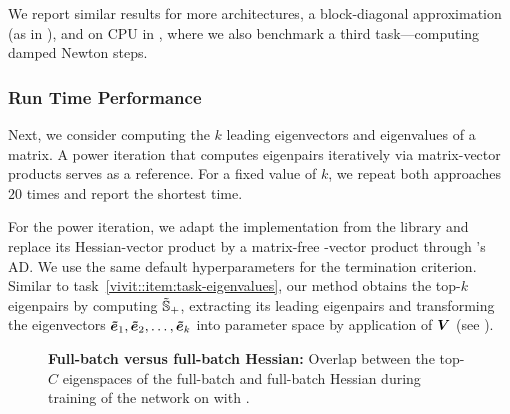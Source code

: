 We report similar results for more architectures, a block-diagonal approximation
(as in \citet{zhang2017blockdiagonal}), and on CPU in
, where we also benchmark a third
task---computing damped Newton steps.

\subsubsection{Run Time Performance}

Next, we consider computing the $k$ leading eigenvectors and eigenvalues of a
matrix. A power iteration that computes eigenpairs iteratively via matrix-vector
products serves as a reference. For a fixed value of $k$, we repeat both
approaches $20$ times and report the shortest time.

For the power iteration, we adapt the implementation from the \pyhessian library
\cite{yao2020pyhessian} and replace its Hessian-vector product by a matrix-free
\ggn-vector product \cite{schraudolph2002fast} through \pytorch's AD. We use the
same default hyperparameters for the termination criterion.
%
Similar to task~\ref{vivit::item:task-eigenvalues}, our method obtains the top-$k$
eigenpairs
by computing $\tilde{{\mathbb{S}}}_{+}$, extracting its leading eigenpairs
and transforming the eigenvectors $\bm{\tilde{e}}_{1}, \bm{\tilde{e}}_{2}, \ldots,
\bm{\tilde{e}}_{k}$ into parameter space by application of ${\bm{V}}$ (see
).

\begin{figure}
  \centering
  
  \tikzexternalenable
  
  \tikzexternaldisable

  \caption{ \textbf{Full-batch \ggn versus full-batch Hessian:} Overlap between the
    top-$C$ eigenspaces of the full-batch \ggn and full-batch Hessian during
    training of the \threecthreed network on \cifarten with \sgd{}. }
  \label{vivit::fig:approx_GGN_Hessian}
\end{figure}

